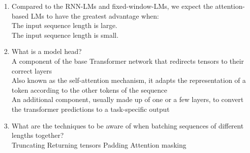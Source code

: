 \begin{enumerate}
        \solution{}
    \item Compared to the RNN-LMs and fixed-window-LMs, we expect the attention-based LMs to have the greatest advantage when: \\ 
        \hspace{1cm}\checkmark{} The input sequence length is large. \\ 
        \hspace{1cm}\choice{} The input sequence length is small. \\
        \solution{}
    \item What is a model head? \\ 
        \hspace{1cm}\choice{} A component of the base Transformer network that redirects tensors to their correct layers \\ 
        \hspace{1cm}\choice{} Also known as the self-attention mechanism, it adapts the representation of a token according to the other tokens of the sequence \\ 
        \hspace{1cm}\checkmark{} An additional component, usually made up of one or a few layers, to convert the transformer predictions to a task-specific output  \\ 
        \solution{}
    \item  What are the techniques to be aware of when batching sequences of different lengths together? \\ 
        \hspace{1cm}\checkmark{} Truncating 
        \hspace{1cm}\choice{} Returning tensors
        \hspace{1cm}\checkmark{} Padding
        \hspace{1cm}\checkmark{} Attention masking \\ 
        \solution{}


\end{enumerate}

\newpage


\newcommand{\xv}{\mathbf{x}}
\newcommand{\yv}{\mathbf{y}}
\newcommand{\Wv}{\mathbf{W}}
\newcommand{\Xv}{\mathbf{X}}
\newcommand{\Yv}{\mathbf{Y}}
\newcommand{\hv}{\mathbf{h}}
\newcommand{\ov}{\mathbf{o}}
\newcommand{\zv}{\mathbf{z}}
\newcommand{\gv}{\mathbf{g}}



